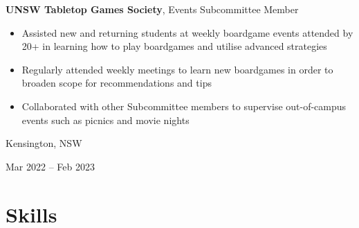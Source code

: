 \documentclass[10pt, a4paper]{article}
\newenvironment{highlights}{
    \begin{itemize}[
        topsep=0.10 cm,
        parsep=0.10 cm,
        partopsep=0pt,
        itemsep=0pt,
        leftmargin=0.4 cm + 10pt
    ]
}{
    \end{itemize}
} %
\newenvironment{twocolentry}[2][]{
    \onecolentry
    \def\secondColumn{#2}
    \setcolumnwidth{\fill, 4.5 cm}
    \begin{paracol}{2}
}{
    \switchcolumn \raggedleft \secondColumn
    \end{paracol}
    \endonecolentry
} %
\begin{document}
        
        \begin{twocolentry}{
            Kensington, NSW

        Mar 2022 – Feb 2023
        }
            \textbf{UNSW Tabletop Games Society}, Events Subcommittee Member
            \begin{highlights}
                \item Assisted new and returning students at weekly boardgame events attended by 20+ in learning how to play boardgames and utilise advanced strategies
                \item Regularly attended weekly meetings to learn new boardgames in order to broaden scope for recommendations and tips
                \item Collaborated with other Subcommittee members to supervise out-of-campus events such as picnics and movie nights
            \end{highlights}
        \end{twocolentry}



    
    \section{Skills}
\end{document}
